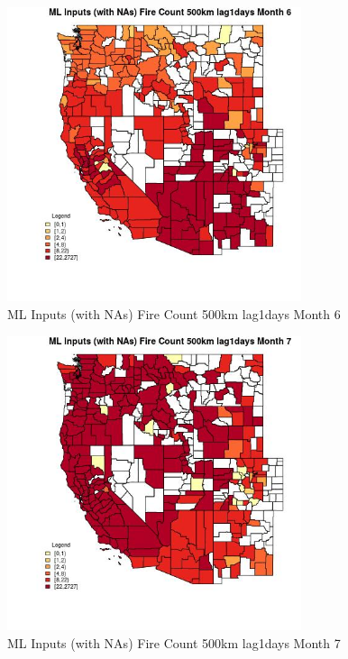 \begin{figure} 
\centering  
\includegraphics[width=0.77\textwidth]{Code_Outputs/Report_ML_input_PM25_Step4_part_f_de_duplicated_aves_prioritize_24hr_obswNAs_CountyFire_Count_500km_lag1daysmedianMonth6.jpg} 
\caption{\label{fig:Report_ML_input_PM25_Step4_part_f_de_duplicated_aves_prioritize_24hr_obswNAsCountyFire_Count_500km_lag1daysmedianMonth6}ML Inputs (with NAs) Fire Count 500km lag1days Month 6} 
\end{figure} 
 

\clearpage 

\begin{figure} 
\centering  
\includegraphics[width=0.77\textwidth]{Code_Outputs/Report_ML_input_PM25_Step4_part_f_de_duplicated_aves_prioritize_24hr_obswNAs_CountyFire_Count_500km_lag1daysmedianMonth7.jpg} 
\caption{\label{fig:Report_ML_input_PM25_Step4_part_f_de_duplicated_aves_prioritize_24hr_obswNAsCountyFire_Count_500km_lag1daysmedianMonth7}ML Inputs (with NAs) Fire Count 500km lag1days Month 7} 
\end{figure} 
 

